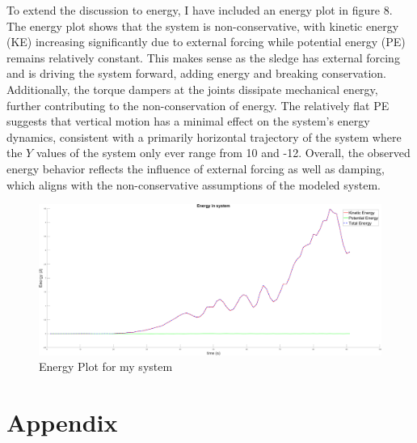 \documentclass{article}
\begin{document}
To extend the discussion to energy, I have included an energy plot in figure 8. The energy plot shows that the system is non-conservative, with kinetic energy (KE) increasing significantly due to external forcing while potential energy (PE) remains relatively constant. This makes sense as the sledge has external forcing and is driving the system forward, adding energy and breaking conservation. Additionally, the torque dampers at the joints dissipate mechanical energy, further contributing to the non-conservation of energy. The relatively flat PE suggests that vertical motion has a minimal effect on the system’s energy dynamics, consistent with a primarily horizontal trajectory of the system where the $Y$ values of the system only ever range from 10 and -12. Overall, the observed energy behavior reflects the influence of external forcing as well as damping, which aligns with the non-conservative assumptions of the modeled system.
\begin{center}
	\begin{figure}[H]
		\includegraphics[width=15cm]{Energy_analysis}
		\caption{Energy Plot for my system}%
	\end{figure}
\end{center}

\section{Appendix}
\end{document}
